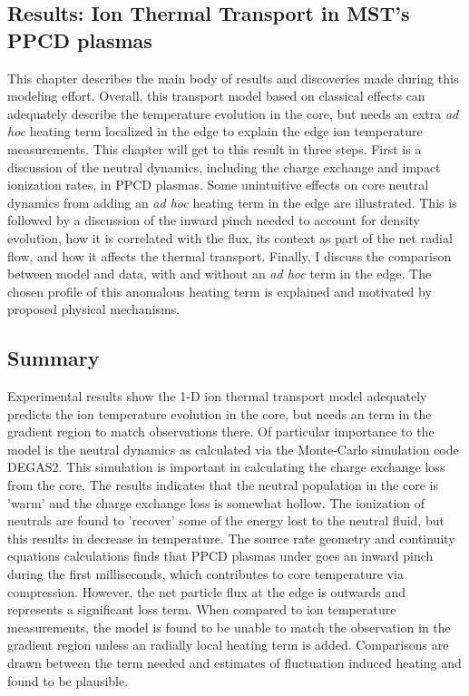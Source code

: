 \begin{refsection}


\chapter{Results: Ion Thermal Transport in MST's PPCD plasmas}\label{ch:results}



This chapter describes the main body of results and discoveries made during this modeling effort. Overall, this transport model based on classical effects can adequately describe the temperature evolution in the core, but needs an extra \textit{ad hoc} heating term localized in the edge to explain the edge ion temperature measurements. This chapter will get to this result in three steps. First is a discussion of the neutral dynamics, including the charge exchange and impact ionization rates, in PPCD plasmas. Some unintuitive effects on core neutral dynamics from adding an \textit{ad hoc} heating term in the edge are illustrated. This is followed by a discussion of the inward pinch needed to account for density evolution, how it is correlated with the \ecb flux, its context as part of the net radial flow, and how it affects the thermal transport. Finally, I discuss the comparison between model and data, with and without an \textit{ad hoc} term in the edge. The chosen profile of this anomalous heating term is explained and motivated by proposed physical mechanisms. 




\section{Summary}

Experimental results show the 1-D ion thermal transport model adequately predicts the ion temperature evolution in the core, but needs an \adhoc term in the gradient region to match observations there. Of particular importance to the model is the neutral dynamics as calculated via the Monte-Carlo simulation code DEGAS2. This simulation is important in calculating the charge exchange loss from the core. The results indicates that the neutral population in the core is 'warm' and the charge exchange loss is somewhat hollow. The ionization of neutrals are found to 'recover' some of the energy lost to the neutral fluid, but this results in decrease in temperature. The source rate geometry and continuity equations calculations finds that PPCD plasmas under goes an inward pinch during the first milliseconds, which contributes to core temperature via compression. However, the net particle flux at the edge is outwards and represents a significant loss term. When compared to ion temperature measurements, the model is found to be unable to match the observation in the gradient region unless an radially local \adhoc heating term is added. Comparisons are drawn between the \adhoc term needed and estimates of fluctuation induced heating and found to be plausible.


\printbibliography
\end{refsection}